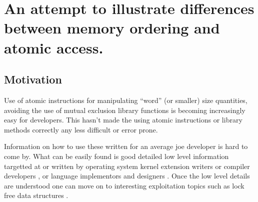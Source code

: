 

\usepackage{listings}


\chapter{An attempt to illustrate differences between memory ordering and atomic access.}
\label{chap:atomic}
\date{Oct 8, 2009}

\beginArtWithToc

\section{Motivation}

Use of atomic instructions for manipulating ``word'' (or smaller) size quantities, avoiding the use of mutual exclusion library functions is becoming increasingly easy for developers.  This hasn't made the using atomic instructions or library methods correctly any less difficult or error prone.

Information on how to use these written for an average joe developer is hard to come by.  What can be easily found is good detailed low level information targetted at or written by operating system kernel extension writers or compiler developers \cite{lyons2002powerpc}, or language implementors and designers \cite{lea2005jsr} \cite{boehmMM} \cite{manson2004jsr} \cite{boehm2007c++} \cite{sutter2006prism} \cite{blainey2007weakmm} \cite{adve1996shared}.  Once the low level details are understood one can move on to interesting exploitation topics such as lock free data structures \cite{harris2002practical} \cite{harris2001pragmatic} \cite{harrisPapers} \cite{benciaWeb} \cite{michael2002safe} \cite{valois-lock}.

